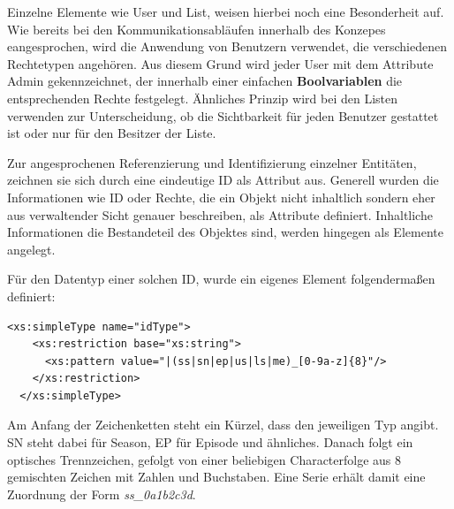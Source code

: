 \documentclass[a4paper]{article}
\begin{document}
Einzelne Elemente wie User und List, weisen hierbei noch eine Besonderheit auf. Wie bereits bei den Kommunikationsabläufen innerhalb des Konzepes eangesprochen, wird die Anwendung von Benutzern verwendet, die verschiedenen Rechtetypen angehören. Aus diesem Grund wird jeder User mit dem Attribute Admin gekennzeichnet, der innerhalb einer einfachen \textbf{Boolvariablen} die entsprechenden Rechte festgelegt. Ähnliches Prinzip wird bei den Listen verwenden zur Unterscheidung, ob die Sichtbarkeit für jeden Benutzer gestattet ist oder nur für den Besitzer der Liste.

\parskip 12pt
\parindent 0pt
Zur angesprochenen Referenzierung und Identifizierung einzelner Entitäten, zeichnen sie sich durch eine eindeutige ID als Attribut aus. Generell wurden die Informationen wie ID oder Rechte, die ein Objekt nicht inhaltlich sondern eher aus verwaltender Sicht genauer beschreiben, als Attribute definiert. Inhaltliche Informationen die Bestandeteil des Objektes sind, werden hingegen als Elemente angelegt.

Für den Datentyp einer solchen ID, wurde ein eigenes Element folgendermaßen definiert:
\begin{lstlisting}[label=xsd-definition,caption= Definition der globalen ID's]
  <xs:simpleType name="idType">
    <xs:restriction base="xs:string">
      <xs:pattern value="|(ss|sn|ep|us|ls|me)_[0-9a-z]{8}"/> 
    </xs:restriction>
  </xs:simpleType>
\end{lstlisting}

Am Anfang der Zeichenketten steht ein Kürzel, dass den jeweiligen Typ angibt. SN steht dabei für Season, EP für Episode und ähnliches. Danach folgt ein optisches Trennzeichen, gefolgt von einer beliebigen Characterfolge aus 8 gemischten Zeichen mit Zahlen und Buchstaben. Eine Serie erhält damit eine Zuordnung der Form \textit{ss\_0a1b2c3d}.
\end{document}
